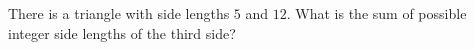 There is a triangle with side lengths $5$ and $12$. What is the sum of possible integer side lengths of the third side?
